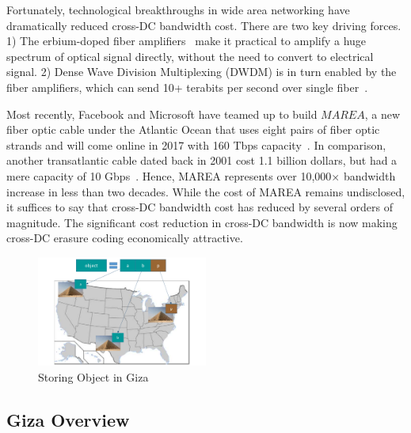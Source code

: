 Fortunately, technological breakthroughs in wide area networking have dramatically reduced cross-DC bandwidth cost.
There are two key driving forces. 1) The erbium-doped fiber
amplifiers~\cite{mears1986low} make it practical to amplify a huge spectrum of
optical signal directly, without the need to convert to electrical signal.
2) Dense Wave Division Multiplexing (DWDM) is in turn enabled by the fiber
amplifiers, which can send 10+ terabits per second over single fiber~\cite{zhu2011112}.

Most recently, Facebook and Microsoft have teamed up to build $MAREA$, a new
fiber optic cable under the Atlantic Ocean that uses eight pairs of fiber optic
strands and will come online in 2017 with 160 Tbps capacity~\cite{bib:MAREA1, bib:MAREA2}.
In comparison, another transatlantic cable dated back in 2001 cost 1.1 billion dollars,
but had a mere capacity of 10 Gbps~\cite{bib:FA-1}.
Hence, MAREA represents over 10,000$\times$ bandwidth increase in less than two decades.
While the cost of MAREA remains undisclosed, it suffices
to say that cross-DC bandwidth cost has reduced by several orders of magnitude.
The significant cost reduction in cross-DC bandwidth is now
making cross-DC erasure coding economically attractive.


\begin{figure}[tp]
\centering
\includegraphics[width=0.5\textwidth]{images/giza_example_crop_fit}
\caption{Storing Object in Giza}
\label{fig:giza_example}
\end{figure}

\subsection{Giza Overview}


